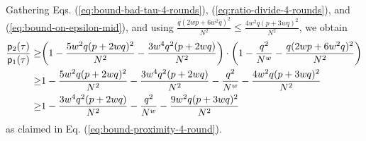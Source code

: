 Gathering Eqs. (\ref{eq:bound-bad-tau-4-rounds}), (\ref{eq:ratio-divide-4-rounds}), and (\ref{eq:bound-on-epsilon-mid}), and using $\frac{q(2wp+6w^2q)^2}{N^2}\leq\frac{4w^2q(p+3wq)^2}{N^2}$, we obtain
%
\begin{align*}
\frac{\mathsf{p}_{2}(\tau)}{\mathsf{p}_{1}(\tau)}   \geq   & \bigg(1-
%
\frac{5w^2q(p+2wq)^2}{N^2}-
\frac{3w^4q^2(p+2wq)}{N^2}
%
\bigg)\cdot\bigg(1-\frac{q^2}{N^w}-\frac{q(2wp+6w^2q)^2}{N^2}\bigg)     \notag      \\
\geq  &  1-\frac{5w^2q(p+2wq)^2}{N^2}-
\frac{3w^4q^2(p+2wq)}{N^2}-\frac{q^2}{N^w}-\frac{4w^2q(p+3wq)^2}{N^2}     \notag        \\
\geq  &  1-
\frac{3w^4q^2(p+2wq)}{N^2}-\frac{q^2}{N^w}-\frac{9w^2q(p+3wq)^2}{N^2}     \notag   
\end{align*}
%
as claimed in Eq. (\ref{eq:bound-proximity-4-round}).
